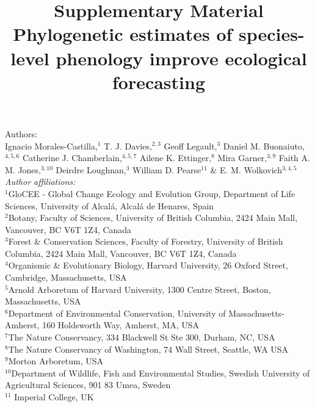 \documentclass[11pt]{article}
\begin{document}



\title{Supplementary Material\\
Phylogenetic estimates of species-level phenology improve ecological forecasting}
\author{} %
\maketitle


\noindent Authors:\\
Ignacio Morales-Castilla,$^{1}$ T. J. Davies,$^{2,3}$ Geoff Legault,$^{3}$ Daniel M. Buonaiuto,$^{4,5,6}$ Catherine J. Chamberlain,$^{4,5,7}$ Ailene K. Ettinger,$^{8}$ Mira Garner,$^{3,9}$ Faith A. M. Jones,$^{3,10}$ Deirdre Loughnan,$^{3}$ William D. Pearse$^{11}$ \& E. M. Wolkovich$^{3,4,5}$  \vspace{2ex}\\
\emph{Author affiliations:}\\
$^{1}$GloCEE - Global Change Ecology and Evolution Group, Department of Life Sciences, University of Alcal\'a, Alcal\'a de Henares, Spain\\ %
 $^{2}$Botany, Faculty of Sciences, University of British Columbia, 2424 Main Mall, Vancouver, BC V6T 1Z4, Canada\\
$^{3}$Forest \& Conservation Sciences, Faculty of Forestry, University of British Columbia, 2424 Main Mall, Vancouver, BC V6T 1Z4, Canada\\
$^{4}$Organismic \& Evolutionary Biology, Harvard University, 26 Oxford Street, Cambridge, Massachusetts, USA\\
$^{5}$Arnold Arboretum of Harvard University, 1300 Centre Street, Boston, Massachusetts, USA\\
$^{6}$Department of Environmental Conservation, University of Massachusetts-Amherst, 160 Holdsworth Way, Amherst, MA, USA\\  %
 $^{7}$The Nature Conservancy, 334 Blackwell St Ste 300, Durham, NC, USA \\ %
$^{8}$The Nature Conservancy of Washington, 74 Wall Street, Seattle, WA  USA \\ %
$^{9}$Morton Arboretum, USA  \\ 
$^{10}$Department of Wildlife, Fish and Environmental Studies, Swedish University of Agricultural Sciences, 901 83 Umea, Sweden\\ %
$^{11}$ Imperial College, UK\\
\end{document}
